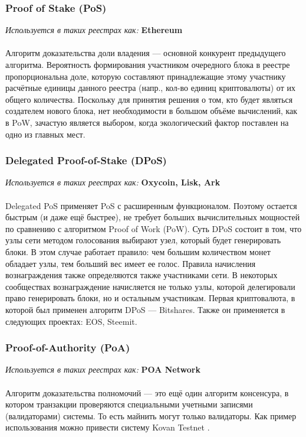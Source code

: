 \subsubsection{Proof of Stake (PoS)}
\emph{Используется в таких реестрах как: } \textbf{Ethereum} \\\\
Алгоритм доказательства доли владения --- основной конкурент предыдущего
алгоритма. Вероятность формирования участником очередного блока в реестре
пропорциональна доле, которую составляют принадлежащие этому участнику
расчётные единицы данного реестра (напр., кол-во единиц криптовалюты) от их
общего количества. Поскольку для принятия решения о том, кто будет являться
создателем нового блока, нет необходимости в большом объёме вычислений, как в
PoW, зачастую является выбором, когда экологический фактор поставлен на одно из
главных мест.

\subsubsection{Delegated Proof-of-Stake (DPoS)}
\emph{Используется в таких реестрах как: } \textbf{Oxycoin, Lisk, Ark} \\\\
Delegated PoS применяет PoS с расширенным функционалом. Поэтому остается
быстрым (и даже ещё быстрее), не требует больших вычислительных мощностей по
сравнению с алгоритмом Proof of Work (PoW). Суть DPoS состоит в том, что узлы
сети методом голосования выбирают узел, который будет генерировать блоки. В
этом случае работает правило: чем большим количеством монет обладает узлы, тем
больший вес имеет ее голос. Правила начисления вознаграждения также
определяются также участниками сети. В некоторых сообществах вознаграждение
начисляется не только узлы, которой делегировали право генерировать блоки, но и
остальным участникам. Первая криптовалюта, в которой был применен алгоритм DPoS
--- Bitshares. Также он применяется в следующих проектах: EOS, Steemit.

\subsubsection{Proof-of-Authority (PoA)}
\emph{Используется в таких реестрах как: } \textbf{POA Network} \\\\
Алгоритм доказательства полномочий --- это ещё один алгоритм консенсура, в
котором транзакции проверяются специальными учетными записями (валидаторами)
системы. То есть майнить могут только валидаторы. Как пример использования
можно привести систему Kovan Testnet \cite{Etherium2018}.


